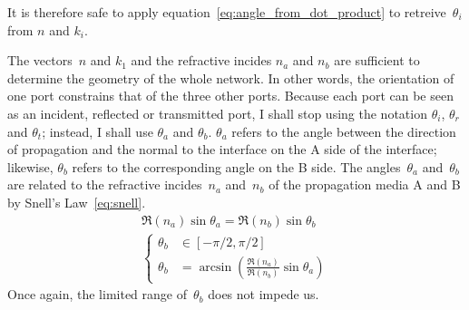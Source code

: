 It is therefore safe to apply equation~\eqref{eq:angle_from_dot_product} to retreive~$\theta_i$ from $n$ and $k_i$.

The vectors~$n$ and $k_1$ and the refractive incides $n_a$ and $n_b$ are sufficient to determine the geometry of the whole network.
In other words, the orientation of one port constrains that of the three other ports.
Because each port can be seen as an incident, reflected or transmitted port, I shall stop using the notation $\theta_i$, $\theta_r$ and $\theta_t$;
instead, I shall use $\theta_a$ and $\theta_b$.
$\theta_a$ refers to the angle between the direction of propagation and the normal to the interface on the A side of the interface;
likewise, $\theta_b$ refers to the corresponding angle on the B side.
The angles~$\theta_a$ and~$\theta_b$ are related to the refractive incides~$n_a$ and~$n_b$ of the propagation media A and B by Snell's Law~\eqref{eq:snell}.
\begin{gather}
    \Re(n_a) \sin \theta_a = \Re(n_b) \sin \theta_b
    \label{eq:snell}
    \\
    \left\lbrace
        \begin{aligned}
            \theta_b &\in [-\pi/2, \pi/2]
            \\
            \theta_b &= \arcsin
            \left(
                \frac{\Re(n_a)}{\Re(n_b)}
                \sin \theta_a
            \right)
        \end{aligned}
    \right.
    \label{eq:snell_thetab}
\end{gather}
Once again, the limited range of~$\theta_b$ does not impede us.


